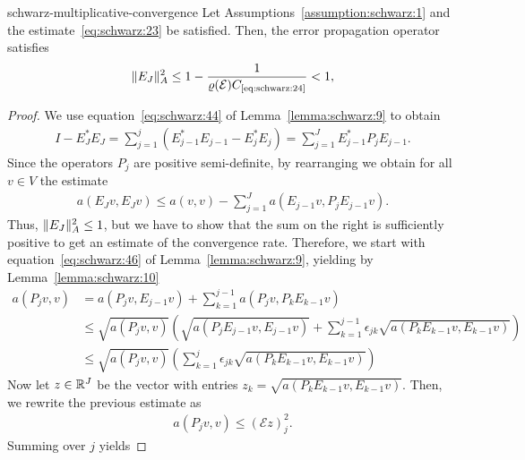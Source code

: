 \begin{Theorem}{schwarz-multiplicative-convergence}
  Let Assumptions~\ref{assumption:schwarz:1} and the
  estimate~\eqref{eq:schwarz:23} be satisfied. Then, the error
  propagation operator satisfies
  \begin{gather}
    \label{eq:schwarz:47}
    \norm{E_J}_A^2 \le 1 - \frac{1}{\rho(\mathcal E) \constref{eq:schwarz:24}} < 1,
  \end{gather}
\end{Theorem}

\begin{proof}
  We use equation~\eqref{eq:schwarz:44} of Lemma~\ref{lemma:schwarz:9} to obtain
  \begin{gather*}
    I- E^*_J E_J = \sum_{j=1}^{j} \left(E^*_{j-1}E_{j-1} -
      E^*_{j}E_{j}\right)
    = \sum_{j=1}^J E^*_{j-1} P_j E_{j-1}.
  \end{gather*}
  Since the operators $P_j$ are positive semi-definite, by rearranging
  we obtain for all $v\in V$ the estimate
  \begin{gather}
    \label{eq:schwarz:49}
    a(E_J v, E_J v) \le a(v,v) - \sum_{j=1}^J a(E_{j-1}v, P_j E_{j-1}v).
  \end{gather}
  Thus, $\lVert E_J\rVert_A^2 \le 1$, but we have to show that the sum on the
  right is sufficiently positive to get an estimate of the convergence
  rate. Therefore, we start with equation~\eqref{eq:schwarz:46} of
  Lemma~\ref{lemma:schwarz:9}, yielding by Lemma~\ref{lemma:schwarz:10}
  \begin{align*}
    a(P_j v,v)
    &= a(P_j v, E_{j-1}v) + \sum_{k=1}^{j-1} a(P_j v, P_k E_{k-1} v)
    \\
    &\le \sqrt{a(P_j v,v)} \left(\sqrt{a(P_j E_{j-1}v,E_{j-1}v)}
    + \sum_{k=1}^{j-1} \epsilon_{jk} \sqrt{a(P_k E_{k-1}v,E_{k-1}v)}
    \right) \\
    & \le \sqrt{a(P_j v,v)} \left(\sum_{k=1}^{j} \epsilon_{jk}
      \sqrt{a(P_k E_{k-1} v,E_{k-1} v)}
    \right)
  \end{align*}
  Now let $z \in \mathbb R^J$ be the vector with entries $z_k = \sqrt{a(P_k
    E_{k-1}v,E_{k-1}v)}$. Then, we rewrite the previous estimate as
  \begin{gather*}
    a(P_j v,v) \le (\mathcal E z)_j^2.
  \end{gather*}
  Summing over $j$ yields
  

\end{proof}
